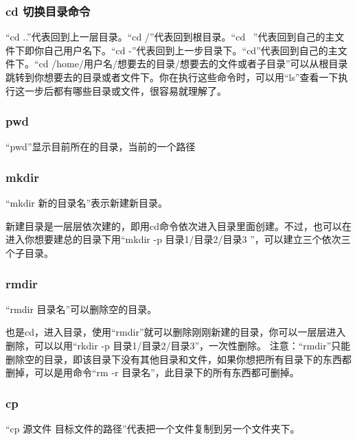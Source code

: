 \documentclass[12pt]{article}
\begin{document}
\subsubsection{cd 切换目录命令}
“cd ..”代表回到上一层目录。“cd /”代表回到根目录。“cd ~”代表回到自己的主文件下即你自己用户名下。“cd -”代表回到上一步目录下。“cd”代表回到自己的主文件下。“cd /home/用户名/想要去的目录/想要去的文件或者子目录”可以从根目录跳转到你想要去的目录或者文件下。你在执行这些命令时，可以用“ls”查看一下执行这一步后都有哪些目录或文件，很容易就理解了。
\subsubsection{pwd}

“pwd”显示目前所在的目录，当前的一个路径
\subsubsection{mkdir}
“mkdir 新的目录名”表示新建新目录。

新建目录是一层层依次建的，即用cd命令依次进入目录里面创建。不过，也可以在进入你想要建总的目录下用“mkdir -p 目录1/目录2/目录3 ”，可以建立三个依次三个子目录。
\subsubsection{rmdir}
“rmdir 目录名”可以删除空的目录。

也是cd，进入目录，使用“rmdir”就可以删除刚刚新建的目录，你可以一层层进入删除，可以以用“rkdir -p 目录1/目录2/目录3”，一次性删除。
{\color{red}注意：}“{\color{red}rmdir}”只能删除{\color{red}空的目录}，即该目录下没有其他目录和文件，如果你想把所有目录下的东西都删掉，可以是用命令“rm -r 目录名”，此目录下的所有东西都可删掉。
\subsubsection{cp}
“cp 源文件 目标文件的路径”代表把一个文件复制到另一个文件夹下。
\end{document}
